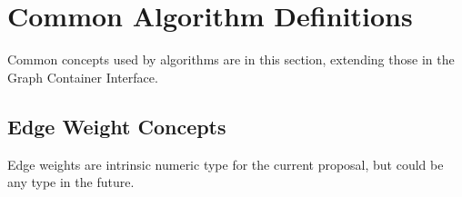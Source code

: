 

\clearpage
\section{Common Algorithm Definitions}






Common concepts used by algorithms are in this section, extending those in the Graph Container Interface.

\subsection{Edge Weight Concepts}
Edge weights are intrinsic numeric type for the current proposal, but could be any type in the future.

